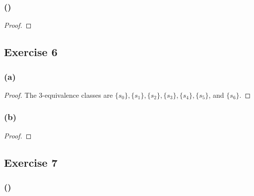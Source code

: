 \documentclass[14pt]{extarticle}
\begin{document}
\subsubsection{()}

\begin{proof}

\end{proof}

\subsection{Exercise 6}

\subsubsection{(a)}

\begin{proof}
The 3-equivalence classes are \(\{s_0\}, \{s_1\}, \{s_2\}, \{s_3\}, \{s_4\}, \{s_5\}\), and \(\{s_6\}\).
\end{proof}

\subsubsection{(b)}

\begin{proof}

\end{proof}

\subsection{Exercise 7}

\subsubsection{()}
\end{document}

